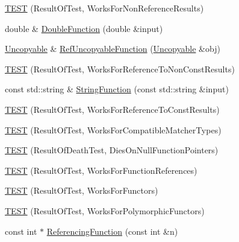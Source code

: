 \begin{DoxyCompactItemize}
\item 
\mbox{\hyperlink{namespacetesting_1_1gmock__matchers__test_a86f01e29ee48050d401fceca21d1041e}{T\+E\+ST}} (Result\+Of\+Test, Works\+For\+Non\+Reference\+Results)
\item 
double \& \mbox{\hyperlink{namespacetesting_1_1gmock__matchers__test_a48350ba4c1ce65694ec07e9c1c49a452}{Double\+Function}} (double \&input)
\item 
\mbox{\hyperlink{classtesting_1_1gmock__matchers__test_1_1Uncopyable}{Uncopyable}} \& \mbox{\hyperlink{namespacetesting_1_1gmock__matchers__test_aa6f7dd285163d5880cfd6685bec8cab4}{Ref\+Uncopyable\+Function}} (\mbox{\hyperlink{classtesting_1_1gmock__matchers__test_1_1Uncopyable}{Uncopyable}} \&obj)
\item 
\mbox{\hyperlink{namespacetesting_1_1gmock__matchers__test_a505e866c4066d27854cb6754c66a3eec}{T\+E\+ST}} (Result\+Of\+Test, Works\+For\+Reference\+To\+Non\+Const\+Results)
\item 
const std\+::string \& \mbox{\hyperlink{namespacetesting_1_1gmock__matchers__test_abe0b3ba3be22e6b973ac6aa226ae85f3}{String\+Function}} (const std\+::string \&input)
\item 
\mbox{\hyperlink{namespacetesting_1_1gmock__matchers__test_a17b952cce22be6338fb1369f886d61c4}{T\+E\+ST}} (Result\+Of\+Test, Works\+For\+Reference\+To\+Const\+Results)
\item 
\mbox{\hyperlink{namespacetesting_1_1gmock__matchers__test_a1aceb307c843f0f5532053e390a7c654}{T\+E\+ST}} (Result\+Of\+Test, Works\+For\+Compatible\+Matcher\+Types)
\item 
\mbox{\hyperlink{namespacetesting_1_1gmock__matchers__test_a4c929e5b46a503a9bb48c8b88dcbbf2a}{T\+E\+ST}} (Result\+Of\+Death\+Test, Dies\+On\+Null\+Function\+Pointers)
\item 
\mbox{\hyperlink{namespacetesting_1_1gmock__matchers__test_a1638ee6460100cbe21c65b6cdc06579a}{T\+E\+ST}} (Result\+Of\+Test, Works\+For\+Function\+References)
\item 
\mbox{\hyperlink{namespacetesting_1_1gmock__matchers__test_a19b7a39915f7ad5a0b741caf7ae4e619}{T\+E\+ST}} (Result\+Of\+Test, Works\+For\+Functors)
\item 
\mbox{\hyperlink{namespacetesting_1_1gmock__matchers__test_a976290e53e319b06c51a94f7e450d765}{T\+E\+ST}} (Result\+Of\+Test, Works\+For\+Polymorphic\+Functors)
\item 
const int $\ast$ \mbox{\hyperlink{namespacetesting_1_1gmock__matchers__test_af3164fc302e0b727c1eb745bdeb959f6}{Referencing\+Function}} (const int \&n)

\end{DoxyCompactItemize}
